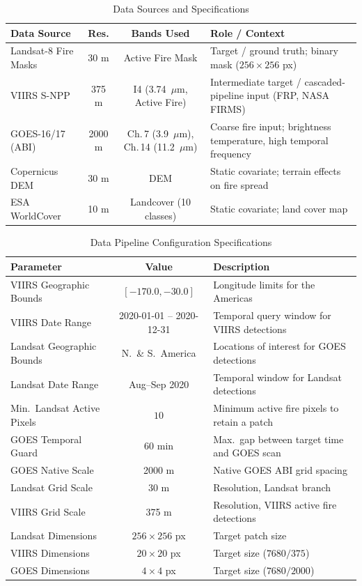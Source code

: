 \documentclass[a4paper, 11pt]{article} %
\begin{document}
\begin{table}[htbp]
\centering
\small
\caption{Data Sources and Specifications}
\label{tab:data_sources}
\begin{tabularx}{\textwidth}{lccY}
\hline
\textbf{Data Source} & \textbf{Res.} & \textbf{Bands Used} & \textbf{Role / Context} \\ \hline
Landsat-8 Fire Masks & 30 m & Active Fire Mask \cite{dealmeidapereiraActiveFireDetection2021} & Target / ground truth; binary mask ($256\times256$ px) \\
VIIRS S-NPP & 375 m & I4 (3.74~$\mu$m, Active Fire) & Intermediate target / cascaded-pipeline input (FRP, NASA FIRMS) \\
GOES-16/17 (ABI) & 2000 m & Ch.\,7 (3.9~$\mu\text{m}$), Ch.\,14 (11.2~$\mu\text{m}$) & Coarse fire input; brightness temperature, high temporal frequency \\
Copernicus DEM & 30 m & DEM & Static covariate; terrain effects on fire spread \\
ESA WorldCover & 10 m & Landcover (10 classes) & Static covariate; land cover map \\ \hline
\end{tabularx}
\end{table}

\begin{table}[htbp]
\centering
\small
\caption{Data Pipeline Configuration Specifications}
\label{tab:pipeline_configs}
\begin{tabularx}{\textwidth}{lcY}
\hline
\textbf{Parameter} & \textbf{Value} & \textbf{Description} \\ \hline
VIIRS Geographic Bounds & $[-170.0, -30.0]$ & Longitude limits for the Americas \\
VIIRS Date Range & 2020-01-01 -- 2020-12-31 & Temporal query window for VIIRS detections \\
Landsat Geographic Bounds & N.\ \& S.\ America & Locations of interest for GOES detections \\
Landsat Date Range & Aug--Sep 2020 & Temporal window for Landsat detections \cite{dealmeidapereiraActiveFireDetection2021} \\
Min.\ Landsat Active Pixels & $10$ & Minimum active fire pixels to retain a patch \\
GOES Temporal Guard & 60 min & Max.\ gap between target time and GOES scan \\
GOES Native Scale & 2000 m & Native GOES ABI grid spacing \\
Landsat Grid Scale & 30 m & Resolution, Landsat branch \\
VIIRS Grid Scale & 375 m & Resolution, VIIRS active fire detections \\
Landsat Dimensions & $256 \times 256$ px & Target patch size \\
VIIRS Dimensions & $20 \times 20$ px & Target size ($7680/375$) \\
GOES Dimensions & $4 \times 4$ px & Target size ($7680/2000$) \\ \hline
\end{tabularx}
\end{table}
\end{document}
